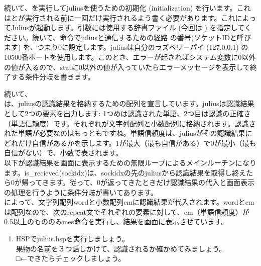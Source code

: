 続いて、を実行してjuliusを使うための初期化 (initialization) を行います。これはとが実行される前に一回だけ実行されるよう書く必要があります。これによってJuliusが起動します。引数には使用する辞書ファイル (今回は ) を指定してください。続いて、命令でjuliusと通信するための経路 の番号(ソケットIDと呼びます) を、つまり0に設定します。juliusは自分のラズベリーパイ (127.0.0.1) の10500番ポートを使用します。このとき、エラーが起きればシステム変数に0以外の値が入るので、statに0以外の値が入っていたらエラーメッセージを表示して終了する条件分岐を書きます。

続いて、\\
は、juliusの認識結果を格納するための配列を宣言しています。juliusは認識結果として2つの要素を出力します: 1つめは認識された単語、2つ目は認識の正確さ（単語信頼度）です。それぞれが文字列配列と小数配列に格納されます。認識された単語が必要なのはもっともですね。単語信頼度は、juliusがその認識結果にどれだけ自信があるかを示します。1が最大（最も自信がある）で0が最小（最も自信がない）で、小数で表されます。\\
以下が認識結果を画面に表示するための無限ループによるメインルーチンになります。is\_recieved(sockidx)は、sockidxの先のjuliusから認識結果を取得し終えたら0が帰ってきます。従って、0が返ってきたときだけ認識結果の代入と画面表示の処理を行うように条件分岐が書いてあります。\\
によって、文字列配列wordと小数配列cmに認識結果が代入されます。wordとcmは配列なので、次のrepeat文でそれぞれの要素に対して、cm（単語信頼度）が0.5以上のもののみmes命令を実行し、結果を画面に表示させています。\\
\begin{tcolorbox}[title=\useOmetoi]
\begin{enumerate}
\item HSPでjulius.hspを実行しましょう。\\果物の名前を３つ話しかけて、認識されるか確かめてみましょう。\\□←できたらチェックしましょう。
\end{enumerate}
\end{tcolorbox}
